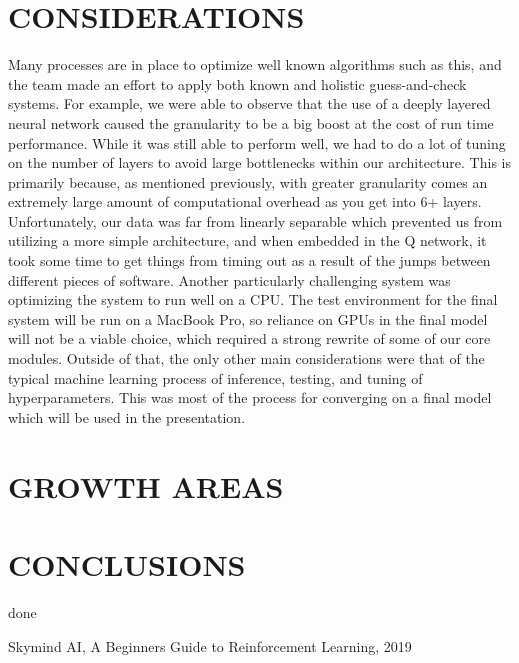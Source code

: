 \documentclass[letterpaper, 11 pt, conference]{ieeeconf}  %
\begin{document}
\section{CONSIDERATIONS}
Many processes are in place to optimize well known algorithms such as this, and the team made an effort to apply both known and holistic guess-and-check systems. For example, we were able to observe that the use of a deeply layered neural network caused the granularity to be a big boost at the cost of run time performance. While it was still able to perform well, we had to do a lot of tuning on the number of layers to avoid large bottlenecks within our architecture. This is primarily because, as mentioned previously, with greater granularity comes an extremely large amount of computational overhead as you get into 6+ layers. Unfortunately, our data was far from linearly separable which prevented us from utilizing a more simple architecture, and when embedded in the Q network, it took some time to get things from timing out as a result of the jumps between different pieces of software. Another particularly challenging system was optimizing the system to run well on a CPU. The test environment for the final system will be run on a MacBook Pro, so reliance on GPUs in the final model will not be a viable choice, which required a strong rewrite of some of our core modules. Outside of that, the only other main considerations were that of the typical machine learning process of inference, testing, and tuning of hyperparameters. This was most of the process for converging on a final model which will be used in the presentation.

\section{GROWTH AREAS}

\section{CONCLUSIONS}
done

\addtolength{\textheight}{-12cm}
                                  




\begin{thebibliography}{99}

 Skymind AI, A Beginners Guide to Reinforcement Learning, 2019







\end{thebibliography}
\end{document}
